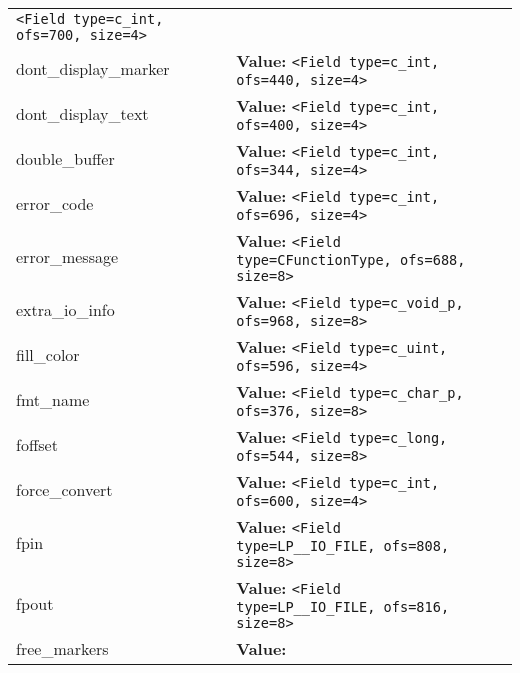 \begin{longtable}{|p{\varnamewidth}|p{\vardescrwidth}|l}
{\tt {\textless}Field type=c\_int, ofs=700, size=4{\textgreater}}&\\
\cline{1-2}
\raggedright d\-o\-n\-t\-\_\-d\-i\-s\-p\-l\-a\-y\-\_\-m\-a\-r\-k\-e\-r\- & \raggedright \textbf{Value:} 
{\tt {\textless}Field type=c\_int, ofs=440, size=4{\textgreater}}&\\
\cline{1-2}
\raggedright d\-o\-n\-t\-\_\-d\-i\-s\-p\-l\-a\-y\-\_\-t\-e\-x\-t\- & \raggedright \textbf{Value:} 
{\tt {\textless}Field type=c\_int, ofs=400, size=4{\textgreater}}&\\
\cline{1-2}
\raggedright d\-o\-u\-b\-l\-e\-\_\-b\-u\-f\-f\-e\-r\- & \raggedright \textbf{Value:} 
{\tt {\textless}Field type=c\_int, ofs=344, size=4{\textgreater}}&\\
\cline{1-2}
\raggedright e\-r\-r\-o\-r\-\_\-c\-o\-d\-e\- & \raggedright \textbf{Value:} 
{\tt {\textless}Field type=c\_int, ofs=696, size=4{\textgreater}}&\\
\cline{1-2}
\raggedright e\-r\-r\-o\-r\-\_\-m\-e\-s\-s\-a\-g\-e\- & \raggedright \textbf{Value:} 
{\tt {\textless}Field type=CFunctionType, ofs=688, size=8{\textgreater}}&\\
\cline{1-2}
\raggedright e\-x\-t\-r\-a\-\_\-i\-o\-\_\-i\-n\-f\-o\- & \raggedright \textbf{Value:} 
{\tt {\textless}Field type=c\_void\_p, ofs=968, size=8{\textgreater}}&\\
\cline{1-2}
\raggedright f\-i\-l\-l\-\_\-c\-o\-l\-o\-r\- & \raggedright \textbf{Value:} 
{\tt {\textless}Field type=c\_uint, ofs=596, size=4{\textgreater}}&\\
\cline{1-2}
\raggedright f\-m\-t\-\_\-n\-a\-m\-e\- & \raggedright \textbf{Value:} 
{\tt {\textless}Field type=c\_char\_p, ofs=376, size=8{\textgreater}}&\\
\cline{1-2}
\raggedright f\-o\-f\-f\-s\-e\-t\- & \raggedright \textbf{Value:} 
{\tt {\textless}Field type=c\_long, ofs=544, size=8{\textgreater}}&\\
\cline{1-2}
\raggedright f\-o\-r\-c\-e\-\_\-c\-o\-n\-v\-e\-r\-t\- & \raggedright \textbf{Value:} 
{\tt {\textless}Field type=c\_int, ofs=600, size=4{\textgreater}}&\\
\cline{1-2}
\raggedright f\-p\-i\-n\- & \raggedright \textbf{Value:} 
{\tt {\textless}Field type=LP\_\_IO\_FILE, ofs=808, size=8{\textgreater}}&\\
\cline{1-2}
\raggedright f\-p\-o\-u\-t\- & \raggedright \textbf{Value:} 
{\tt {\textless}Field type=LP\_\_IO\_FILE, ofs=816, size=8{\textgreater}}&\\
\cline{1-2}
\raggedright f\-r\-e\-e\-\_\-m\-a\-r\-k\-e\-r\-s\- & \raggedright \textbf{Value:} 

\end{longtable}
